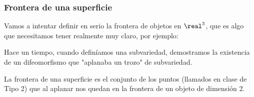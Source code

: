 \subsubsection{Frontera de una superficie}
Vamos a intentar definir en serio la frontera de objetos en $\real^3$, que es algo que necesitamos tener realmente muy claro, por ejemplo:


Hace un tiempo, cuando definíamos una subvariedad, demostramos la existencia de un difeomorfismo que "aplanaba un trozo" de subvariedad. 

La frontera de una superficie es el conjunto de los puntos (llamados en clase de Tipo 2) que al aplanar nos quedan en la frontera de un objeto de dimensión 2.

